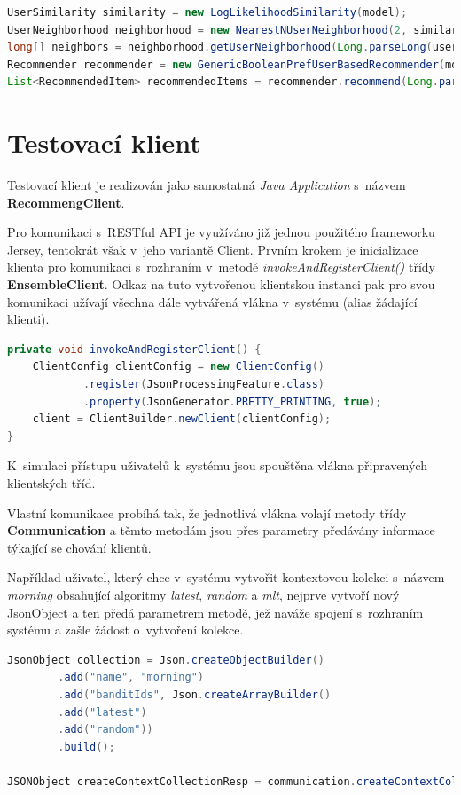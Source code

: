 \documentclass[thesis=M,czech]{FITthesis}[2014/05/07]
\begin{document}
\begin{lstlisting}[language=java]
UserSimilarity similarity = new LogLikelihoodSimilarity(model);
UserNeighborhood neighborhood = new NearestNUserNeighborhood(2, similarity, model);
long[] neighbors = neighborhood.getUserNeighborhood(Long.parseLong(userId));
Recommender recommender = new GenericBooleanPrefUserBasedRecommender(model, neighborhood, similarity);
List<RecommendedItem> recommendedItems = recommender.recommend(Long.parseLong(userId), limit);
\end{lstlisting}

\section{Testovací klient}
\label{chap:client}
Testovací klient je realizován jako samostatná \emph{Java Application} s~názvem \textbf{RecommengClient}.

Pro komunikaci s~RESTful API je využíváno již jednou použitého frameworku Jersey, tentokrát však v~jeho variantě Client. Prvním krokem je inicializace klienta pro komunikaci s~rozhraním v~metodě \emph{invokeAndRegisterClient()} třídy \textbf{EnsembleClient}. Odkaz na tuto vytvořenou klientskou instanci pak pro svou komunikaci užívají všechna dále vytvářená vlákna v~systému (alias žádající klienti).

\begin{lstlisting}[language=java]
private void invokeAndRegisterClient() {
    ClientConfig clientConfig = new ClientConfig()
            .register(JsonProcessingFeature.class)
            .property(JsonGenerator.PRETTY_PRINTING, true);
    client = ClientBuilder.newClient(clientConfig);        
}   
\end{lstlisting}

K~simulaci přístupu uživatelů k~systému jsou spouštěna vlákna připravených klientských tříd.

Vlastní komunikace probíhá tak, že jednotlivá vlákna volají metody třídy \textbf{Communication} a těmto metodám jsou přes parametry předávány informace týkající se chování klientů.

Například uživatel, který chce v~systému vytvořit kontextovou kolekci s~názvem \emph{morning} obsahující algoritmy \emph{latest}, \emph{random} a \emph{mlt}, nejprve vytvoří nový JsonObject a ten předá parametrem metodě, jež naváže spojení s~rozhraním systému a zašle žádost o~vytvoření kolekce.

\begin{lstlisting}[language=java]
JsonObject collection = Json.createObjectBuilder()
        .add("name", "morning")
        .add("banditIds", Json.createArrayBuilder()
        .add("latest")
        .add("random"))
        .build();

JSONObject createContextCollectionResp = communication.createContextCollectionRest(collection);
\end{lstlisting}
\end{document}
